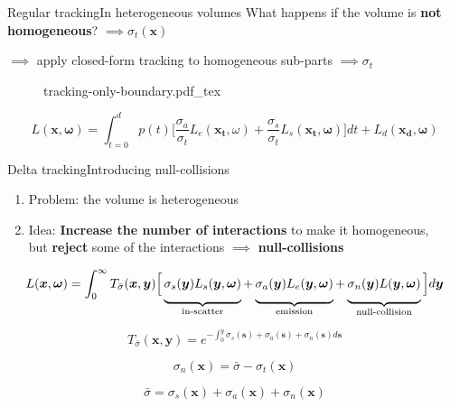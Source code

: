 \documentclass[
  english,            %
  aspectratio=169,    %
]{tumbeamer}
\newcommand\bx[0]{\bm{x}}
\newcommand\by[0]{\bm{y}}
\newcommand\bomega[0]{\bm{\omega}}
\newcommand*\mystrut[1]{\vrule width0pt height0pt depth#1\relax}
\begin{document}
\begin{frame}{Regular tracking}{In heterogeneous volumes}
  What happens if the volume is \textbf{not homogeneous}? 
  \hspace{5.4em}$\implies$$\sigma_t(\bm{x})$

  $\implies$ apply closed-form tracking to homogeneous sub-parts
  \hspace{2em}$\implies$$\sigma_t$

\begin{figure}[ht]
    \centering
    \def\svgwidth{0.3\columnwidth}
    {tracking-only-boundary.pdf_tex}
\end{figure}

\begin{equation}
    L(\bm{x}, \bm{\omega}) = \int_{t=0}^{d} p(t) 
    \Big[ \frac{\sigma_a}{\sigma_t} L_e(\bm{x_t}, \omega)
    + \frac{\sigma_s}{\sigma_t} L_s(\bm{x_t}, \bomega)
    \Big]dt + L_d(\bm{x_d}, \bm{\omega})
\end{equation}
\end{frame}

\begin{frame}{Delta tracking}{Introducing null-collisions}
\begin{enumerate}
  \item Problem: the volume is heterogeneous
  \item Idea: \textbf{Increase the number of interactions} to make it
    homogeneous,\\
    but \textbf{reject} some of the interactions $\implies$
    \textbf{null-collisions}
\end{enumerate}

\begin{equation}
    L(\bx, \bomega) = \int_0^\infty 
    T_{\bar\sigma}(\bm{x},\bm{y})
    \Big[
        \underbrace{\mystrut{2ex}
            \sigma_s(\by)L_s(\by, \bomega)
        }_{\text{in-scatter}}
        + 
        \underbrace{\mystrut{2ex}
            \sigma_a(\by)L_e(\by, \bomega)
        }_{\text{emission}}
        +
        \underbrace{\mystrut{2ex}
            \sigma_n(\by)L(\by, \bomega)
        }_{\text{null-collision}}
    \Big]
    d\by
\end{equation}

\vfill
\begin{equation}
  T_{\bar\sigma}(\bm{x},\bm{y}) = 
  e^{-\int_0^y \sigma_s(\bm{s}) + \sigma_a(\bm{s}) + \sigma_n(\bm{s}) d\bm{s}}
\end{equation}

\begin{equation}
  \sigma_n(\bx) = \bar\sigma - \sigma_t(\bx)
\end{equation}

\begin{equation}
  \bar\sigma = \sigma_s(\bm{x}) + \sigma_a(\bm{x}) + \sigma_n(\bm{x})
\end{equation}

\end{frame}
\end{document}

